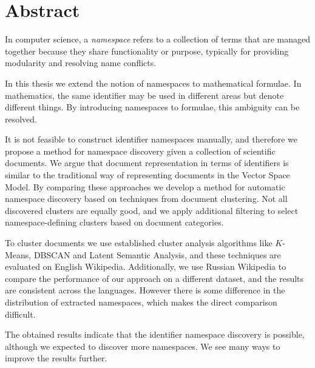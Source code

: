 \section*{Abstract}


In computer science, a \emph{namespace} refers to a collection of
terms that are managed together because they share functionality or
purpose, typically for providing modularity and resolving name conflicts.

In this thesis we extend the notion of namespaces to mathematical formulae.
In mathematics, the same identifier may be used in different areas
but denote different things. By introducing namespaces to
formulae, this ambiguity can be resolved. 

It is not feasible to construct identifier namespaces manually, and 
therefore we propose a method for namespace discovery given a collection
of scientific documents. We argue that document representation in terms 
of identifiers is similar to the traditional way of representing documents
in the Vector Space Model. By comparing these approaches we
develop a method for automatic namespace discovery based on techniques from
document clustering. Not all discovered clusters are equally good, and we apply 
additional filtering to select namespace-defining clusters based on 
document categories.

To cluster documents we use established cluster analysis algorithms like
$K$-Means, DBSCAN and Latent Semantic Analysis, and these techniques
are evaluated on English Wikipedia. Additionally, we use Russian
Wikipedia to compare the performance of our approach on a different dataset, and
the results are consistent across the languages. However there is some difference
in the distribution of extracted namespaces, which makes the direct 
comparison difficult. 

The obtained results indicate that the identifier namespace discovery is
possible, although we expected to discover more namespaces. We see many ways 
to improve the results further.
